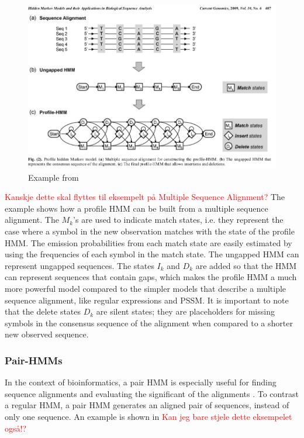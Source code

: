 \documentclass{article}
\begin{document}
\begin{figure}
    \centering
    \includegraphics[width = \textwidth]{exampleProfileHMM.png}
    \caption{Example from \cite{Yoon2009}}
    \label{fig:Yoon2009ProfileHMMExample}
\end{figure}

\textcolor{red}{Kanskje dette skal flyttes til eksempelt på Multiple Sequence Alignment?}
The example shows how a profile HMM can be built from a multiple sequence alignment. The $M_k$'s are used to indicate match states, i.e. they represent the case where a symbol in the new observation matches with the state of the profile HMM. The emission probabilities from each match state are easily estimated by using the frequencies of each symbol in the match state. The ungapped HMM can represent ungapped sequences. The states $I_k$ and $D_k$ are added so that the HMM can represent sequences that contain gaps, which makes the profile HMM a much more powerful model compared to the simpler models that describe a multiple sequence alignment, like regular expressions and PSSM. It is important to note that the delete states $D_k$ are silent states; they are placeholders for missing symbols in the consensus sequence of the alignment when compared to a shorter new observed sequence. 

\subsubsection{Pair-HMMs}
In the context of bioinformatics, a pair HMM is especially useful for finding sequence alignments and evaluating the significant of the alignments \cite{Yoon2009}. To contrast a regular HMM, a pair HMM generates an aligned pair of sequences, instead of only one sequence. An example is shown in \cite{Yoon2009} \textcolor{red}{Kan jeg bare stjele dette eksempelet også!?}
\end{document}
